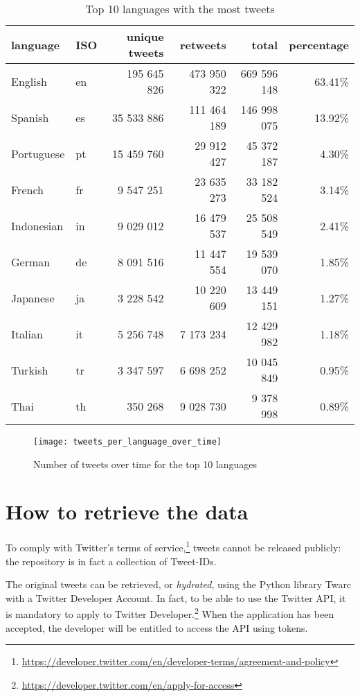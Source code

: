 \begin{table}[H]
    \centering
    \begin{tabularx}{\columnwidth}{@{}XXrrrr@{}}
    		\bottomrule
    		\textbf{language} & \textbf{ISO} & \textbf{unique tweets} & \textbf{retweets} & \textbf{total} & \textbf{percentage} \\
    		\midrule
        English & en & 195 645 826 & 473 950 322 & 669 596 148 & 63.41\% 
        \\
		Spanish & es & 35 533 886 & 111 464 189 & 146 998 075 & 13.92\% 
		\\
		Portuguese & pt & 15 459 760 & 29 912 427 & 45 372 187 & 4.30\% 
		\\
		French & fr & 9 547 251 & 23 635 273 & 33 182 524 & 3.14\% 
		\\
		Indonesian & in & 9 029 012 & 16 479 537 & 25 508 549 & 2.41\%
		\\
		German & de & 8 091 516 & 11 447 554 & 19 539 070 & 1.85\%
		\\
		Japanese & ja & 3 228 542 & 10 220 609 & 13 449 151 & 1.27\%
		\\
		Italian & it & 5 256 748 & 7 173 234 & 12 429 982 & 1.18\%
		\\
		Turkish & tr & 3 347 597 & 6 698 252 & 10 045 849 & 0.95\%
		\\
		Thai & th & 350 268 & 9 028 730 & 9 378 998 & 0.89\%
		\\
		\bottomrule
    \end{tabularx}
    \caption{Top 10 languages with the most tweets}
    \label{tab:dataset-language-stats}
\end{table}

\begin{figure}[H]
	\centering
    	\texttt{[image: tweets\_per\_language\_over\_time]}
    	\caption{Number of tweets over time for the top 10 languages}
    	\label{fig:tweets-language-over-time}
\end{figure}

\section{How to retrieve the data}
\label{sec:retrieve-data}

To comply with Twitter's terms of service,\footnote{\url{https://developer.twitter.com/en/developer-terms/agreement-and-policy}} tweets cannot be released publicly: the repository is in fact a collection of Tweet-IDs.

The original tweets can be retrieved, or \textit{hydrated}, using the Python library Twarc with a Twitter Developer Account. In fact, to be able to use the Twitter API, it is mandatory to apply to Twitter Developer.\footnote{\url{https://developer.twitter.com/en/apply-for-access}} When the application has been accepted, the developer will be entitled to access the API using tokens. 

